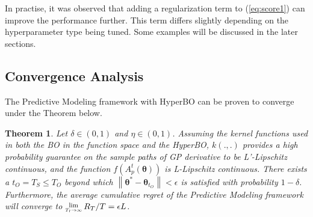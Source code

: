 \documentclass{article}
\newcommand{\Lim}[1]{\raisebox{0.5ex}{\scalebox{0.8}{$\displaystyle \lim_{#1}\;$}}}
\newtheorem{theorem}{Theorem}
\begin{document}
In practise, it was observed that adding a regularization term to (\ref{eq:score1}) can improve the performance further. This term differs slightly depending on the hyperparameter type being tuned. Some examples will be discussed in the later sections.

\subsection{Convergence Analysis}

The Predictive Modeling framework with HyperBO can be proven to converge under the Theorem below.

\begin{theorem}
	Let $\delta \in (0,1)$ and $\eta \in (0,1)$. Assuming the kernel functions used in both the BO in the function space and the HyperBO, $k(.,.)$ provides a high probability guarantee on the sample paths of GP derivative to be L'-Lipschitz continuous, and the function $f(A^{t}_{p}(\boldsymbol{\theta}))$ is L-Lipschitz continuous. There exists a $t_O = T_{S} \leq T_{O}$ beyond which $\left\|\boldsymbol{\theta}^{*}-\boldsymbol{\theta}_{t_{O}}\right\| < \epsilon$ is satisfied with probability $1-\delta$. Furthermore, the average cumulative regret of the Predictive Modeling framework will converge to $\Lim{T_{I} \rightarrow \infty} R_{T}/T = \epsilon L$.
\end{theorem}
\end{document}
